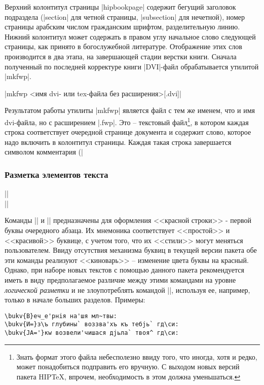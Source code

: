 \documentclass{ltxguide}
\begin{document}
Верхний колонтитул страницы |hipbookpage| содержит бегущий заголовок
подраздела (|section| для четной страницы, |subsection| для нечетной),
номер страницы арабским числом гражданским шрифтом, разделительную
линию. Нижний колонтитул может содержать в правом углу начальное слово
следующей страницы, как принято в богослужебной
литературе. Отображение этих слов производится в два этапа, на
завершающей стадии верстки книги. Сначала полученный по последней
корректуре книги |DVI|-файл обрабатывается утилитой |mkfwp|.

\begin{decl}
  |mkfwp <имя dvi- или tex-файла без расширения>[.dvi]|
\end{decl}

Результатом работы утилиты |mkfwp| является файл с тем же именем, что и имя
dvi-файла, но с расширением |.fwp|. Это -- текстовый файл\footnote{Знать формат этого файла
небесполезно ввиду того, что иногда, хотя и редко, может понадобиться
подправить его вручную. С выходом новых версий пакета HIP\TeX, впрочем,
необходимость в этом должна уменьшаться.}, в котором каждая
строка соответствует очередной странице документа и содержит слово, которое
надо включить в колонтитул {} страницы. Каждая такая строка
завершается символом комментария (|%

\subsubsection{Разметка элементов текста}

\begin{decl}
  ||\\
  ||
\end{decl}

Команды |\bukv| и |\Bukv| предназначены для оформления <<красной строки>> -
первой буквы очередного абзаца. Их мнемоника соответствует <<простой>>
и <<красивой>> буквице, с учетом того, что их <<стили>> могут меняться пользователем.
Ввиду отсутствия механизма буквиц в текущей версии пакета обе эти
команды реализуют <<киноварь>> -- изменение цвета буквы на
красный. Однако, при наборе новых текстов с помощью данного пакета
рекомендуется иметь в виду предполагаемое различие между этими
командами на уровне {\em логической разметки} и не злоупотреблять
командой |\Bukv|, используя ее, например, только в начале больших
разделов. Примеры:

\begin{verbatim}
\bukv{В}еч_e'рнiя на'шя мл~твы:
\bukv{И=}з\ъ глубины` воззва'хъ къ тебjь` гд\си:
\bukv{JА='}кw возвели'чишася дjьла` твоя^ гд\си:
\end{verbatim}
\end{document}

